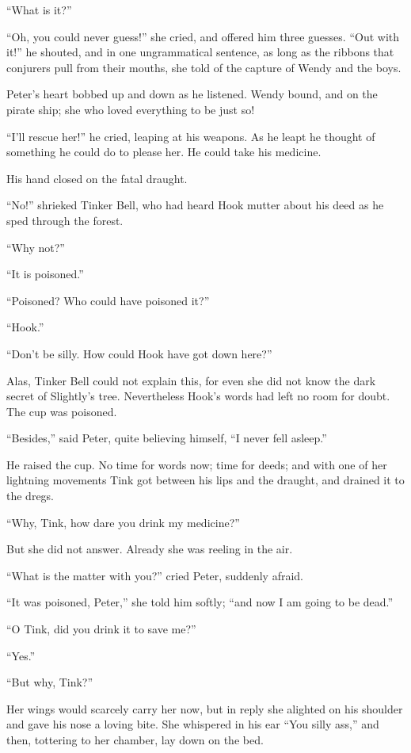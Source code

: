 ``What is it?''

``Oh, you could never guess!'' she cried, and offered him three guesses.
``Out with it!'' he shouted, and in one ungrammatical sentence, as long
as the ribbons that conjurers pull from their mouths, she told of the
capture of Wendy and the boys.

Peter's heart bobbed up and down as he listened. Wendy bound, and on
the pirate ship; she who loved everything to be just so!

``I'll rescue her!'' he cried, leaping at his weapons. As he leapt he
thought of something he could do to please her. He could take his
medicine.

His hand closed on the fatal draught.

``No!'' shrieked Tinker Bell, who had heard Hook mutter about his deed as
he sped through the forest.

``Why not?''

``It is poisoned.''

``Poisoned? Who could have poisoned it?''

``Hook.''

``Don't be silly. How could Hook have got down here?''

Alas, Tinker Bell could not explain this, for even she did not know the
dark secret of Slightly's tree. Nevertheless Hook's words had left no
room for doubt. The cup was poisoned.

``Besides,'' said Peter, quite believing himself, ``I never fell asleep.''

He raised the cup. No time for words now; time for deeds; and with one
of her lightning movements Tink got between his lips and the draught,
and drained it to the dregs.

``Why, Tink, how dare you drink my medicine?''

But she did not answer. Already she was reeling in the air.

``What is the matter with you?'' cried Peter, suddenly afraid.

``It was poisoned, Peter,'' she told him softly; ``and now I am going to
be dead.''

``O Tink, did you drink it to save me?''

``Yes.''

``But why, Tink?''

Her wings would scarcely carry her now, but in reply she alighted on
his shoulder and gave his nose a loving bite. She whispered in his ear
``You silly ass,'' and then, tottering to her chamber, lay down on the
bed.

